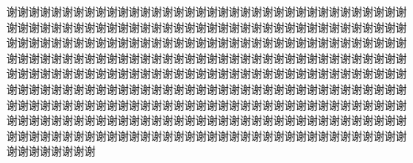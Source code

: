 
\par 谢谢谢谢谢谢谢谢谢谢谢谢谢谢谢谢谢谢谢谢谢谢谢谢谢谢谢谢谢谢谢谢谢谢谢谢谢谢谢谢谢谢谢谢谢谢谢谢谢谢谢谢谢谢谢谢谢谢谢谢谢谢谢谢谢谢谢谢谢谢谢谢谢谢谢谢谢谢谢谢谢谢谢谢谢谢谢谢谢谢谢谢谢谢谢谢谢谢谢谢谢谢谢谢谢谢谢谢谢谢谢谢谢谢谢谢谢谢谢谢谢谢谢谢谢谢谢谢谢谢谢谢谢谢谢谢谢谢谢谢谢谢谢谢谢谢谢谢谢谢谢谢谢谢谢谢谢谢谢谢谢谢谢谢谢谢谢谢谢谢谢谢谢谢谢谢谢谢谢谢谢谢谢谢谢谢谢谢谢谢谢谢谢谢谢谢谢谢谢谢谢谢谢谢谢谢谢谢谢谢谢谢谢谢谢谢谢谢谢谢谢谢谢谢谢谢谢谢谢谢谢谢谢谢谢谢谢谢谢谢谢谢谢谢谢谢谢谢谢谢谢谢谢谢谢谢谢谢谢谢谢谢谢谢谢谢谢谢谢谢谢谢谢谢谢谢谢谢谢谢谢谢谢谢谢谢谢谢谢谢谢谢谢谢谢谢谢谢谢谢谢谢谢谢谢谢谢谢谢谢谢谢谢谢谢谢谢谢谢谢谢谢谢谢谢谢谢谢谢谢谢谢